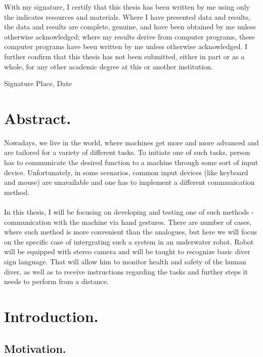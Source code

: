 \documentclass[a4paper,11pt,oneside]{article}
\begin{document}
  With my signature, I certify that this thesis has been written by me
  using only the indicates resources and materials. Where I have
  presented data and results, the data and results are complete,
  genuine, and have been obtained by me unless otherwise acknowledged;
  where my results derive from computer programs, these computer
  programs have been written by me unless otherwise acknowledged. I
  further confirm that this thesis has not been submitted, either in
  part or as a whole, for any other academic degree at this or another
  institution.

  \vspace{20mm}

  Signature \hfill Place, Date

  \newpage

  \section*{Abstract.}
  
  Nowadays, we live in the world, where machines get more and more advanced and are tailored for a variety of different tasks. To initiate one of such tasks, person has to communicate the desired function to a machine through some sort of input device. Unfortunately, in some scenarios, common input devices (like keyboard and mouse) are unavailable and one has to implement a different communication method.\\
  \\
  In this thesis, I will be focusing on developing and testing one of such methods - communication with the machine via hand gestures. There are number of cases, where such method is more convenient than the analogues, but here we will focus on the specific case of intergrating such a system in an underwater robot. Robot will be equipped with stereo camera and will be taught to recognize basic diver sign language. That will allow him to monitor health and safety of the human diver, as well as to receive instructions regarding the tasks and further steps it needs to perform from a distance. 

  \newpage
  \tableofcontents

  \clearpage

  \section{Introduction.}
  
  \subsection{Motivation.}
  
\end{document}
